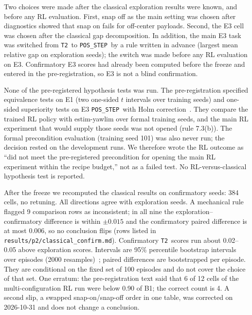 \documentclass[conference]{IEEEtran}
\newcommand{\POS}{\texttt{POS\_STEP}}
\newcommand{\TT}{\texttt{T2}}
\begin{document}
Two choices were made after the classical exploration results were known, and before any RL evaluation.
First, snap off as the main setting was chosen after diagnostics showed that snap on fails for off-center payloads. %
Second, the E3 cell was chosen after the classical gap decomposition. %
In addition, the main E3 task was switched from \TT\ to \POS\ by a rule written in advance (largest mean relative gap on exploration seeds); the switch was made before any RL evaluation on E3. %
Confirmatory E3 scores had already been computed before the freeze and entered in the pre-registration, so E3 is not a blind confirmation. %

None of the pre-registered hypothesis tests was run. The pre-registration specified equivalence tests on E1 (two one-sided $t$ intervals over training seeds) and one-sided superiority tests on E3 \POS\ with Holm correction~\cite{holm1979simple}. %
They compare the trained RL policy with estim-yawlim over formal training seeds, and the main RL experiment that would supply those seeds was not opened (rule 7.3(b)).
The formal precondition evaluation (training seed 101) was also never run; the decision rested on the development runs. %
We therefore wrote the RL outcome as ``did not meet the pre-registered precondition for opening the main RL experiment within the recipe budget,'' not as a failed test.
No RL-versus-classical hypothesis test is reported.

After the freeze we recomputed the classical results on confirmatory seeds: 384 cells, no retuning. %
All directions agree with exploration seeds. %
A mechanical rule flagged 9 comparison rows as inconsistent; in all nine the exploration--confirmatory difference is within $\pm0.015$ and the confirmatory paired difference is at most 0.006, so no conclusion flips (rows listed in \texttt{results/p2/classical\_confirm.md}). %
Confirmatory \TT\ scores run about 0.02--0.05 above exploration scores. %
Intervals are 95\% percentile bootstrap intervals over episodes (2000 resamples)~\cite{efron1993introduction}; paired differences are bootstrapped per episode. %
They are conditional on the fixed set of 100 episodes and do not cover the choice of that set. %
One erratum: the pre-registration text said that 6 of 12 cells of the multi-configuration RL run were below 0.90 of B1; the correct count is 4. %
A second slip, a swapped snap-on/snap-off order in one table, was corrected on 2026-10-31 and does not change a conclusion. %
\end{document}
